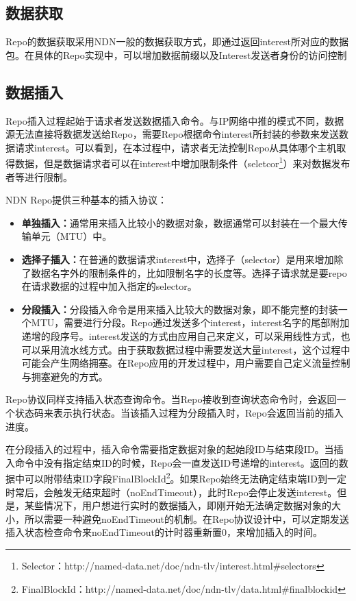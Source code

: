 \subsection{数据获取}
Repo的数据获取采用NDN一般的数据获取方式，即通过返回interest所对应的数据包。在具体的Repo实现中，可以增加数据前缀以及Interest发送者身份的访问控制
\subsection{数据插入}
Repo插入过程起始于请求者发送数据插入命令。与IP网络中推的模式不同，数据源无法直接将数据发送给Repo，需要Repo根据命令interest所封装的参数来发送数据请求interest。可以看到，在本过程中，请求者无法控制Repo从具体哪个主机取得数据，但是数据请求者可以在interest中增加限制条件（seletcor\footnote{Selector：http://named-data.net/doc/ndn-tlv/interest.html\#selectors}）来对数据发布者等进行限制。

NDN Repo提供三种基本的插入协议：
\begin{itemize}
\item \textbf{单独插入：}通常用来插入比较小的数据对象，数据通常可以封装在一个最大传输单元（MTU）中。
\item \textbf{选择子插入：}在普通的数据请求interest中，选择子（selector）是用来增加除了数据名字外的限制条件的，比如限制名字的长度等。选择子请求就是要repo在请求数据的过程中加入指定的selector。
\item \textbf{分段插入：}分段插入命令是用来插入比较大的数据对象，即不能完整的封装一个MTU，需要进行分段。Repo通过发送多个interest，interest名字的尾部附加递增的段序号。interest发送的方式由应用自己来定义，可以采用线性方式，也可以采用流水线方式。由于获取数据过程中需要发送大量interest，这个过程中可能会产生网络拥塞。在Repo应用的开发过程中，用户需要自己定义流量控制与拥塞避免的方式。

\end{itemize}

Repo协议同样支持插入状态查询命令。当Repo接收到查询状态命令时，会返回一个状态码来表示执行状态。当该插入过程为分段插入时，Repo会返回当前的插入进度。

在分段插入的过程中，插入命令需要指定数据对象的起始段ID与结束段ID。当插入命令中没有指定结束ID的时候，Repo会一直发送ID号递增的interest。返回的数据中可以附带结束ID字段FinalBlockId\footnote{FinalBlockId：http://named-data.net/doc/ndn-tlv/data.html\#finalblockid}。如果Repo始终无法确定结束端ID到一定时常后，会触发无结束超时（noEndTimeout），此时Repo会停止发送interest。但是，某些情况下，用户想进行实时的数据插入，即刚开始无法确定数据对象的大小，所以需要一种避免noEndTimeout的机制。在Repo协议设计中，可以定期发送插入状态检查命令来noEndTimeout的计时器重新置0，来增加插入的时间。

